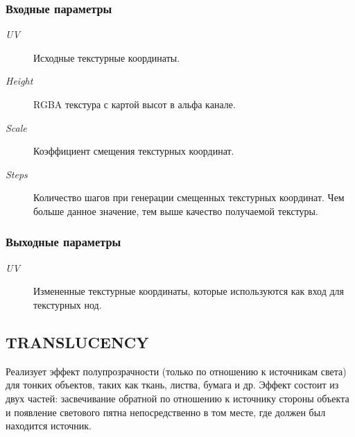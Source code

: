 \documentclass[a4paper,12pt,oneside]{sphinxmanual}
\begin{document}
\subsubsection{Входные параметры}
\label{node_materials:id4}\begin{description}
\item[{\emph{UV}}] \leavevmode
Исходные текстурные координаты.

\item[{\emph{Height}}] \leavevmode
RGBA текстура с картой высот в альфа канале.

\item[{\emph{Scale}}] \leavevmode
Коэффициент смещения текстурных координат.

\item[{\emph{Steps}}] \leavevmode
Количество шагов при генерации смещенных текстурных координат. Чем больше данное значение, тем выше качество получаемой текстуры.

\end{description}


\subsubsection{Выходные параметры}
\label{node_materials:id5}\begin{description}
\item[{\emph{UV}}] \leavevmode
Измененные текстурные координаты, которые используются как вход для текстурных нод.

\end{description}


\subsection{TRANSLUCENCY}
\label{node_materials:translucency}
Реализует эффект полупрозрачности (только по отношению к источникам света) для тонких объектов, таких как ткань, листва, бумага и др. Эффект состоит из двух частей: засвечивание обратной по отношению к источнику стороны объекта и появление светового пятна непосредственно в том месте, где должен был находится источник.
\end{document}
